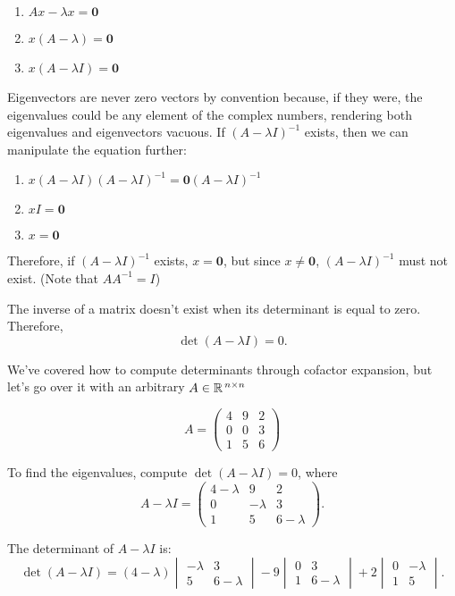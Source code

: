 \documentclass{article}
\begin{document}
\begin{enumerate}
    \item \( A x - \lambda x = \mathbf{0} \)
    \item \( x (A - \lambda) = \mathbf{0} \)
    \item \( x (A - \lambda I) = \mathbf{0} \)
\end{enumerate}

Eigenvectors are never zero vectors by convention because, if they were, the eigenvalues could be any element of the complex numbers, rendering both eigenvalues and eigenvectors vacuous. If \( (A - \lambda I)^{-1} \) exists, then we can manipulate the equation further:

\begin{enumerate}
    \item \( x (A - \lambda I)(A - \lambda I)^{-1} = \mathbf{0} (A - \lambda I)^{-1} \)
    \item \( x I = \mathbf{0} \)
    \item \( x = \mathbf{0} \)
\end{enumerate}

Therefore, if \( (A - \lambda I)^{-1} \) exists, \( x = \mathbf{0} \), but since \( x \neq \mathbf{0} \), \( (A - \lambda I)^{-1} \) must not exist. (Note that \( A A^{-1} = I \))

The inverse of a matrix doesn't exist when its determinant is equal to zero. Therefore,
\[
\det(A - \lambda I) = 0.
\]

We've covered how to compute determinants through cofactor expansion, but let's go over it with an arbitrary $A \in \mathbb{R}^{\hspace{0.5mm}n \times n}$

\[
A = \begin{pmatrix} 4 & 9 & 2 \\ 0 & 0 & 3 \\ 1 & 5 & 6 \end{pmatrix}
\]

To find the eigenvalues, compute \( \det(A - \lambda I) = 0 \), where
\[
A - \lambda I = \begin{pmatrix} 4 - \lambda & 9 & 2 \\ 0 & -\lambda & 3 \\ 1 & 5 & 6 - \lambda \end{pmatrix}.
\]

The determinant of \( A - \lambda I \) is:
\[
\det(A - \lambda I) = (4 - \lambda) \begin{vmatrix} -\lambda & 3 \\ 5 & 6 - \lambda \end{vmatrix} - 9 \begin{vmatrix} 0 & 3 \\ 1 & 6 - \lambda \end{vmatrix} + 2 \begin{vmatrix} 0 & -\lambda \\ 1 & 5 \end{vmatrix}.
\]
\end{document}
